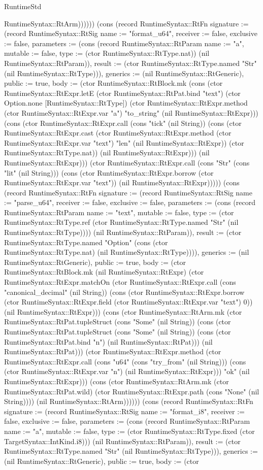 \begin{lexlean}{RuntimeStd}
\begin{semanticmodule}
{RuntimeSyntax::RtArm)))))}) (cons (record RuntimeSyntax::RtFn {signature := (record RuntimeSyntax::RtSig {name := "format_u64", receiver := false, exclusive := false, parameters := (cons (record RuntimeSyntax::RtParam {name := "a", mutable := false, type := (ctor RuntimeSyntax::RtType.nat)}) (nil RuntimeSyntax::RtParam)), result := (ctor RuntimeSyntax::RtType.named "Str" (nil RuntimeSyntax::RtType))}), generics := (nil RuntimeSyntax::RtGeneric), public := true, body := (ctor RuntimeSyntax::RtBlock.mk (cons (ctor RuntimeSyntax::RtExpr.letE (ctor RuntimeSyntax::RtPat.bind "text") (ctor Option.none [RuntimeSyntax::RtType]) (ctor RuntimeSyntax::RtExpr.method (ctor RuntimeSyntax::RtExpr.var "a") "to_string" (nil RuntimeSyntax::RtExpr))) (cons (ctor RuntimeSyntax::RtExpr.call (cons "tick" (nil String)) (cons (ctor RuntimeSyntax::RtExpr.cast (ctor RuntimeSyntax::RtExpr.method (ctor RuntimeSyntax::RtExpr.var "text") "len" (nil RuntimeSyntax::RtExpr)) (ctor RuntimeSyntax::RtType.nat)) (nil RuntimeSyntax::RtExpr))) (nil RuntimeSyntax::RtExpr))) (ctor RuntimeSyntax::RtExpr.call (cons "Str" (cons "lit" (nil String))) (cons (ctor RuntimeSyntax::RtExpr.borrow (ctor RuntimeSyntax::RtExpr.var "text")) (nil RuntimeSyntax::RtExpr))))}) (cons (record RuntimeSyntax::RtFn {signature := (record RuntimeSyntax::RtSig {name := "parse_u64", receiver := false, exclusive := false, parameters := (cons (record RuntimeSyntax::RtParam {name := "text", mutable := false, type := (ctor RuntimeSyntax::RtType.ref (ctor RuntimeSyntax::RtType.named "Str" (nil RuntimeSyntax::RtType)))}) (nil RuntimeSyntax::RtParam)), result := (ctor RuntimeSyntax::RtType.named "Option" (cons (ctor RuntimeSyntax::RtType.nat) (nil RuntimeSyntax::RtType)))}), generics := (nil RuntimeSyntax::RtGeneric), public := true, body := (ctor RuntimeSyntax::RtBlock.mk (nil RuntimeSyntax::RtExpr) (ctor RuntimeSyntax::RtExpr.matchOn (ctor RuntimeSyntax::RtExpr.call (cons "canonical_decimal" (nil String)) (cons (ctor RuntimeSyntax::RtExpr.borrow (ctor RuntimeSyntax::RtExpr.field (ctor RuntimeSyntax::RtExpr.var "text") 0)) (nil RuntimeSyntax::RtExpr))) (cons (ctor RuntimeSyntax::RtArm.mk (ctor RuntimeSyntax::RtPat.tupleStruct (cons "Some" (nil String)) (cons (ctor RuntimeSyntax::RtPat.tupleStruct (cons "Some" (nil String)) (cons (ctor RuntimeSyntax::RtPat.bind "n") (nil RuntimeSyntax::RtPat))) (nil RuntimeSyntax::RtPat))) (ctor RuntimeSyntax::RtExpr.method (ctor RuntimeSyntax::RtExpr.call (cons "u64" (cons "try_from" (nil String))) (cons (ctor RuntimeSyntax::RtExpr.var "n") (nil RuntimeSyntax::RtExpr))) "ok" (nil RuntimeSyntax::RtExpr))) (cons (ctor RuntimeSyntax::RtArm.mk (ctor RuntimeSyntax::RtPat.wild) (ctor RuntimeSyntax::RtExpr.path (cons "None" (nil String)))) (nil RuntimeSyntax::RtArm)))))}) (cons (record RuntimeSyntax::RtFn {signature := (record RuntimeSyntax::RtSig {name := "format_i8", receiver := false, exclusive := false, parameters := (cons (record RuntimeSyntax::RtParam {name := "a", mutable := false, type := (ctor RuntimeSyntax::RtType.fixed (ctor TargetSyntax::IntKind.i8))}) (nil RuntimeSyntax::RtParam)), result := (ctor RuntimeSyntax::RtType.named "Str" (nil RuntimeSyntax::RtType))}), generics := (nil RuntimeSyntax::RtGeneric), public := true, body := (ctor }
\end{semanticmodule}
\end{lexlean}
